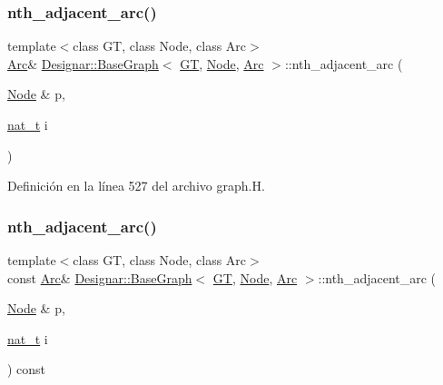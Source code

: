 \subsubsection{\texorpdfstring{nth\+\_\+adjacent\+\_\+arc()}{nth\_adjacent\_arc()}\hspace{0.1cm}{\footnotesize\ttfamily [1/2]}}
{\footnotesize\ttfamily template$<$class GT, class Node, class Arc$>$ \\
\hyperlink{namespace_designar_a3f55fb5513d62ff47cbc8f72b8e95d6f}{Arc}\& \hyperlink{class_designar_1_1_base_graph}{Designar\+::\+Base\+Graph}$<$ \hyperlink{demo-buildgraph_8_c_a3001c40d2c31ca87ed96cd7d1334a55e}{GT}, \hyperlink{namespace_designar_a5af326c65aa2bd26b26c410f2030d09e}{Node}, \hyperlink{namespace_designar_a3f55fb5513d62ff47cbc8f72b8e95d6f}{Arc} $>$\+::nth\+\_\+adjacent\+\_\+arc (\begin{DoxyParamCaption}\item[{\hyperlink{namespace_designar_a5af326c65aa2bd26b26c410f2030d09e}{Node} \&}]{p,  }\item[{\hyperlink{namespace_designar_aa72662848b9f4815e7bf31a7cf3e33d1}{nat\+\_\+t}}]{i }\end{DoxyParamCaption})\hspace{0.3cm}{\ttfamily [inline]}}



Definición en la línea 527 del archivo graph.\+H.

\mbox{\label{class_designar_1_1_base_graph_a3ca561f708fec1724d5c95192f98ef96}} 
\subsubsection{\texorpdfstring{nth\+\_\+adjacent\+\_\+arc()}{nth\_adjacent\_arc()}\hspace{0.1cm}{\footnotesize\ttfamily [2/2]}}
{\footnotesize\ttfamily template$<$class GT, class Node, class Arc$>$ \\
const \hyperlink{namespace_designar_a3f55fb5513d62ff47cbc8f72b8e95d6f}{Arc}\& \hyperlink{class_designar_1_1_base_graph}{Designar\+::\+Base\+Graph}$<$ \hyperlink{demo-buildgraph_8_c_a3001c40d2c31ca87ed96cd7d1334a55e}{GT}, \hyperlink{namespace_designar_a5af326c65aa2bd26b26c410f2030d09e}{Node}, \hyperlink{namespace_designar_a3f55fb5513d62ff47cbc8f72b8e95d6f}{Arc} $>$\+::nth\+\_\+adjacent\+\_\+arc (\begin{DoxyParamCaption}\item[{\hyperlink{namespace_designar_a5af326c65aa2bd26b26c410f2030d09e}{Node} \&}]{p,  }\item[{\hyperlink{namespace_designar_aa72662848b9f4815e7bf31a7cf3e33d1}{nat\+\_\+t}}]{i }\end{DoxyParamCaption}) const\hspace{0.3cm}{\ttfamily [inline]}}



